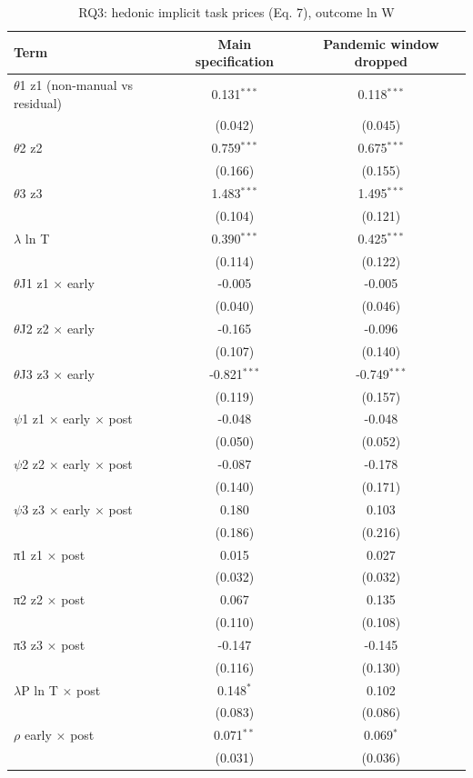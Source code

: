 \begin{table}[htbp]\centering
\caption{RQ3: hedonic implicit task prices (Eq. 7), outcome ln W}
\begin{tabular}{lcc}
\toprule
Term & Main specification & Pandemic window dropped \\
\midrule
$\theta$1  z1 (non-manual vs residual) & 0.131$^{***}$ & 0.118$^{***}$ \\
 & (0.042) & (0.045) \\
$\theta$2  z2 & 0.759$^{***}$ & 0.675$^{***}$ \\
 & (0.166) & (0.155) \\
$\theta$3  z3 & 1.483$^{***}$ & 1.495$^{***}$ \\
 & (0.104) & (0.121) \\
$\lambda$  ln T & 0.390$^{***}$ & 0.425$^{***}$ \\
 & (0.114) & (0.122) \\
$\theta$J1  z1 $\times$ early & -0.005 & -0.005 \\
 & (0.040) & (0.046) \\
$\theta$J2  z2 $\times$ early & -0.165 & -0.096 \\
 & (0.107) & (0.140) \\
$\theta$J3  z3 $\times$ early & -0.821$^{***}$ & -0.749$^{***}$ \\
 & (0.119) & (0.157) \\
$\psi$1  z1 $\times$ early $\times$ post & -0.048 & -0.048 \\
 & (0.050) & (0.052) \\
$\psi$2  z2 $\times$ early $\times$ post & -0.087 & -0.178 \\
 & (0.140) & (0.171) \\
$\psi$3  z3 $\times$ early $\times$ post & 0.180 & 0.103 \\
 & (0.186) & (0.216) \\
π1  z1 $\times$ post & 0.015 & 0.027 \\
 & (0.032) & (0.032) \\
π2  z2 $\times$ post & 0.067 & 0.135 \\
 & (0.110) & (0.108) \\
π3  z3 $\times$ post & -0.147 & -0.145 \\
 & (0.116) & (0.130) \\
$\lambda$P  ln T $\times$ post & 0.148$^{*}$ & 0.102 \\
 & (0.083) & (0.086) \\
$\rho$  early $\times$ post & 0.071$^{**}$ & 0.069$^{*}$ \\
 & (0.031) & (0.036) \\
\bottomrule
\end{tabular}
\par\vspace{2pt}{\footnotesize State-by-quarter, industry and education fixed effects; controls sex and age. Standard errors clustered on occupation in parentheses. * p<0.10, ** p<0.05, *** p<0.01. Holm-adjusted p for $\psi$1-$\psi$3 (main specification): $\psi$1 1.000, $\psi$2 1.000, $\psi$3 1.000. Not shown because identical to the main specification (Eq. 7 does not use exposure): GPT-4-rated exposure, LM-AIOE exposure.}
\end{table}
